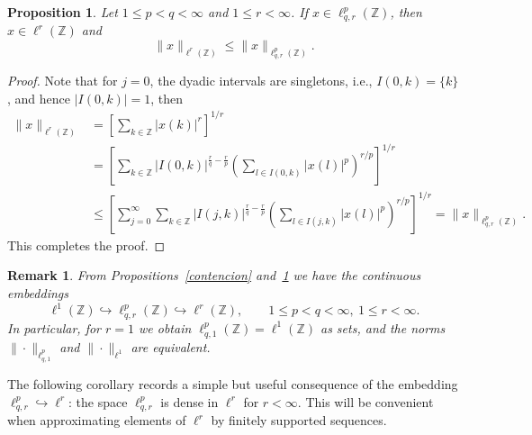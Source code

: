 \documentclass[preprint,12pt]{elsarticle}
\newtheorem{proposition}[theorem]{Proposition}
\newtheorem{remark}[theorem]{Remark}
\begin{document}
\begin{proposition}\label{contentiononlr}
       Let $1\leq p<q<\infty$ and $1\leq r< \infty$. If $x\in \ell^{p}_{q,r}(\mathbb{Z})$, then $x\in \ell^{r}(\mathbb{Z})$ and 
       \begin{equation}
             \|x\|_{\ell^{r}(\mathbb{Z})}\leq \| x\| _{\ell^{p}_{q,r}(\mathbb{Z})}.
       \end{equation}
\end{proposition}
    \begin{proof}
 Note that for $j=0$, the dyadic intervals are singletons, i.e., $I(0,k)=\{k\}$, and hence $\vert I(0,k)\vert =1$, then
    \begin{equation*}
        \begin{split}
          \displaystyle     \|x\|_{\ell^{r}(\mathbb{Z})}&=\left[
\sum\limits_{k\in\mathbb{Z}}
\left\vert x(k)\right\vert ^{r}\right]  ^{1/r}\\
&=\left[\sum\limits_{k\in\mathbb{Z}}
\left\vert I\left(  0,k\right)  \right\vert ^{\frac{r}{q}-\frac{r}
{p}}\left(
{\displaystyle\sum\limits_{l\in I\left(  0,k\right)  }}
\left\vert x(l)\right\vert ^{p}\right)  ^{r/p}\right]  ^{1/r}\\
&\leq \left[
\sum_{j = 0}^{\infty} \sum_{k \in \mathbb{Z}}
\left\vert I\left(  j,k\right)  \right\vert ^{\frac{r}{q}-\frac{r}
{p}}\left(
{\displaystyle\sum\limits_{l\in I\left(  j,k\right)  }}
\left\vert x(l)\right\vert ^{p}\right)  ^{r/p}\right]  ^{1/r}=\| x\| _{\ell^{p}_{q,r}(\mathbb{Z})}.
        \end{split}
    \end{equation*}
This completes the proof.
    \end{proof}
 \begin{remark}\label{rem:l1_case}
From Propositions~\ref{contencion} and~\ref{contentiononlr} we have the continuous embeddings
\[
\ell^{1}(\mathbb Z)\hookrightarrow \ell^{p}_{q,r}(\mathbb Z)\hookrightarrow \ell^{r}(\mathbb Z),
\qquad 1\le p<q<\infty,\ 1\le r<\infty.
\]
In particular, for $r=1$ we obtain $\ell^{p}_{q,1}(\mathbb Z)=\ell^{1}(\mathbb Z)$ as sets, and the norms
$\|\cdot\|_{\ell^{p}_{q,1}}$ and $\|\cdot\|_{\ell^{1}}$ are equivalent.
\end{remark}

   
The following corollary records a simple but useful consequence of the embedding
$\ell^{p}_{q,r}\hookrightarrow \ell^{r}$: the space $\ell^{p}_{q,r}$ is dense in $\ell^{r}$
for $r<\infty$. This will be convenient when approximating elements of $\ell^{r}$ by
finitely supported sequences.
\end{document}
